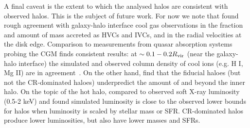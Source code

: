\documentclass[fleqn,usenatbib]{mnras}
\begin{document}
A final caveat is the extent to which the analysed halos are consistent with observed halos.
This is the subject of future work.
For now we note that \cite{Trapp2021} found rough agreement with galaxy-halo interface cool gas observations in the fraction and amount of mass accreted as HVCs and IVCs, and in the radial velocities at the disk edge.
Comparison to measurements from quasar absorption systems probing the CGM finds consistent results:
at $\sim 0.1-0.2 R_{\rm vir}$ (near the galaxy-halo interface) the simulated and observed column density of cool ions (e.g. H I, Mg II) are in agreement~\cite{Ji2020}.
On the other hand, \citeauthor {Ji2020} find that the fiducial haloes (but not the CR-dominated haloes) underpredict the amount of  and  beyond the inner halo.
On the topic of the hot halo, \cite{Chan2021} compared to observed soft X-ray luminosity (0.5-2 keV) and found simulated luminosity is close to the observed lower bounds for halos when luminosity is scaled by stellar mass or SFR.
CR-dominated halos produce lower luminosities, but also have lower masses and SFRs.



\end{document}

